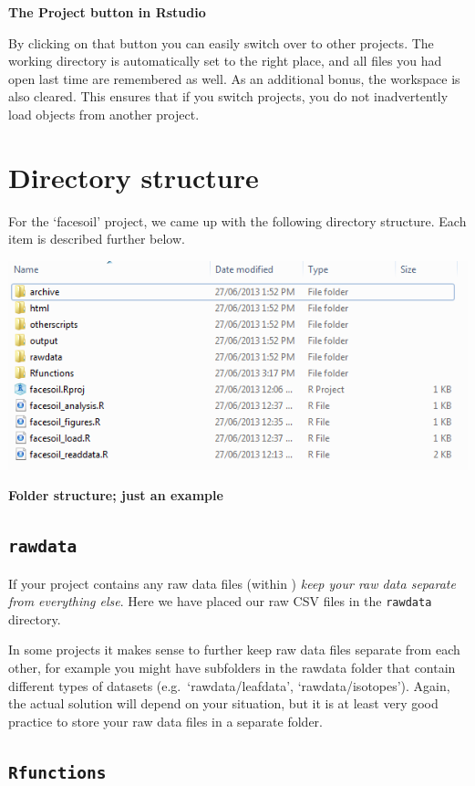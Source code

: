 \documentclass[]{book}
\begin{document}
\textbf{The Project button in Rstudio}

By clicking on that button you can easily switch over to other projects. The working directory is automatically set to the right place, and all files you had open last time are remembered as well. As an additional bonus, the workspace is also cleared. This ensures that if you switch projects, you do not inadvertently load objects from another project.

\hypertarget{directory-structure}{%
\section{Directory structure}\label{directory-structure}}

For the `facesoil' project, we came up with the following directory structure. Each item is described further below.

\includegraphics[width=0.7\linewidth]{screenshots/folderstructure}

\textbf{Folder structure; just an example}

\hypertarget{rawdata}{%
\subsection{\texorpdfstring{\texttt{rawdata}}{rawdata}}\label{rawdata}}

If your project contains any raw data files (within ) \emph{keep your raw data separate from everything else}. Here we have placed our raw CSV files in the \texttt{rawdata} directory.

In some projects it makes sense to further keep raw data files separate from each other, for example you might have subfolders in the rawdata folder that contain different types of datasets (e.g.~`rawdata/leafdata', `rawdata/isotopes'). Again, the actual solution will depend on your situation, but it is at least very good practice to store your raw data files in a separate folder.

\hypertarget{rfunctions}{%
\subsection{\texorpdfstring{\texttt{Rfunctions}}{Rfunctions}}\label{rfunctions}}
\end{document}
